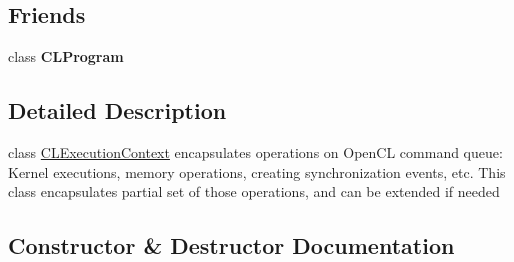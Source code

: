 \subsection*{Friends}
\begin{DoxyCompactItemize}
\item 
class {\bfseries C\+L\+Program}\hypertarget{class_c_l_ray_tracer_1_1_open_c_l_utils_1_1_c_l_execution_context_a5a2118afd420ad2f664e518740aa1e5d}{}\label{class_c_l_ray_tracer_1_1_open_c_l_utils_1_1_c_l_execution_context_a5a2118afd420ad2f664e518740aa1e5d}

\end{DoxyCompactItemize}


\subsection{Detailed Description}
class \hyperlink{class_c_l_ray_tracer_1_1_open_c_l_utils_1_1_c_l_execution_context}{C\+L\+Execution\+Context} encapsulates operations on Open\+CL command queue\+: Kernel executions, memory operations, creating synchronization events, etc. This class encapsulates partial set of those operations, and can be extended if needed 

\subsection{Constructor \& Destructor Documentation}
